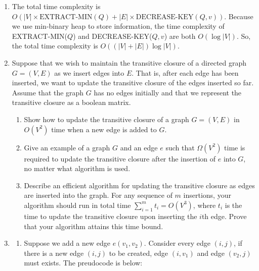 \documentclass[12pt,a4paper]{article}
\makeatletter
\newtheorem*{solution}{Solution}
\theoremstyle{definition}
\renewenvironment{solution}[1][Solution] {\par\pushQED{\qed}\normalfont\topsep6\p@\@plus6\p@\relax\trivlist\item[\hskip\labelsep\bfseries#1\@addpunct{.}]\ignorespaces}{\popQED\endtrivlist\@endpefalse} \makeatother
\makeatother
\begin{document}
\begin{enumerate}
\begin{solution}
\begin{algorithm}[H]

        \end{algorithm}
		The total time complexity is $O(|V|\times \text{EXTRACT-MIN}(Q) + |E|\times \text{DECREASE-KEY}(Q,v) )$. Because we use min-binary heap to store information, the time complexity of EXTRACT-MIN($Q$) and DECREASE-KEY($Q,v$) are both $O(\log |V|)$. So, the total time complexity is $O((|V|+|E|)\log |V|)$.
	\end{solution}

	\item Suppose that we wish to maintain the transitive closure of a directed graph $G=(V,E)$ as we insert edges into $E$. That is, after each edge has been inserted, we want to update the transitive closure of the edges inserted so far. Assume that the graph $G$ has no edges initially and that we represent the transitive closure as a boolean matrix.
	\begin{enumerate}
	    \item Show how to update the transitive closure of a graph $G=(V,E)$ in $O(V^2)$ time when a new edge is added to $G$.
	    \item Give an example of a graph $G$ and an edge $e$ such that $\Omega(V^2)$ time is required to update the transitive closure after the insertion of $e$ into $G$, no matter what algorithm is used.
	    \item Describe an efficient algorithm for updating the transitive closure as edges are inserted into the graph. For any sequence of $m$ insertions, your algorithm should run in total time $\sum_{i=1}^m t_i=O(V^3)$, where $t_i$ is the time to update the transitive closure upon inserting the $i$th edge. Prove that your algorithm attains this time bound.
	\end{enumerate}

	\begin{solution}
		\begin{enumerate}
			\item Suppose we add a new edge $e(v_1,v_2)$. Consider every edge $(i,j)$, if there is a new edge $(i,j)$ to be created, edge $(i,v_1)$ and edge $(v_2,j)$ must exists. The preudocode is below:\\
			\begin{algorithm}[H]
				

\end{algorithm}
\end{enumerate}
\end{solution}
\end{enumerate}
\end{document}
